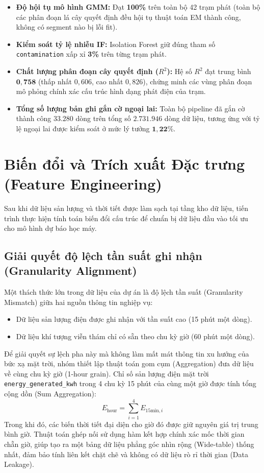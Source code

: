 \documentclass[12pt, a4paper]{report}
\begin{document}
\begin{itemize}
    \item \textbf{Độ hội tụ mô hình GMM:} Đạt \textbf{100\%} trên toàn bộ 42 trạm phát (toàn bộ các phân đoạn lá cây quyết định đều hội tụ thuật toán EM thành công, không có segment nào bị lỗi fit).
    \item \textbf{Kiểm soát tỷ lệ nhiễu IF:} Isolation Forest giữ đúng tham số \texttt{contamination} xấp xỉ \textbf{3\%} trên từng trạm phát.
    \item \textbf{Chất lượng phân đoạn cây quyết định ($R^2$):} Hệ số $R^2$ đạt trung bình $\mathbf{0{,}758}$ (thấp nhất $0{,}606$, cao nhất $0{,}826$), chứng minh các vùng phân đoạn mô phỏng chính xác cấu trúc hình dạng phát điện của trạm.
    \item \textbf{Tổng số lượng bản ghi gắn cờ ngoại lai:} Toàn bộ pipeline đã gắn cờ thành công $\mathbf{33.280}$ dòng trên tổng số $\mathbf{2.731.946}$ dòng dữ liệu, tương ứng với tỷ lệ ngoại lai được kiểm soát ở mức lý tưởng $\mathbf{1{,}22\%}$.
\end{itemize}

\section{Biến đổi và Trích xuất Đặc trưng (Feature Engineering)}
\label{sec:transformation}

Sau khi dữ liệu sản lượng và thời tiết được làm sạch tại tầng kho dữ liệu, tiến trình thực hiện tính toán biến đổi cấu trúc để chuẩn bị dữ liệu đầu vào tối ưu cho mô hình dự báo học máy.

\subsection{Giải quyết độ lệch tần suất ghi nhận (Granularity Alignment)}
Một thách thức lớn trong dữ liệu của dự án là độ lệch tần suất (Granularity Mismatch) giữa hai nguồn thông tin nghiệp vụ:
\begin{itemize}
    \item Dữ liệu sản lượng điện được ghi nhận với tần suất cao (15 phút một dòng).
    \item Dữ liệu khí tượng viễn thám chỉ có sẵn theo chu kỳ giờ (60 phút một dòng).
\end{itemize}

Để giải quyết sự lệch pha này mà không làm mất mát thông tin xu hướng của bức xạ mặt trời, nhóm thiết lập thuật toán gom cụm (Aggregation) đưa dữ liệu về cùng chu kỳ giờ (1-hour grain). Chỉ số sản lượng điện mặt trời \texttt{energy\_generated\_kwh} trong 4 chu kỳ 15 phút của cùng một giờ được tính tổng cộng dồn (Sum Aggregation):
\begin{equation}
E_{\text{hour}} = \sum_{i=1}^{4} E_{15\text{min}, i}
\end{equation}
Trong khi đó, các biến thời tiết đại diện cho giờ đó được giữ nguyên giá trị trung bình giờ. Thuật toán ghép nối sử dụng hàm kết hợp chính xác mốc thời gian chẵn giờ, giúp tạo ra một bảng dữ liệu phẳng góc nhìn rộng (Wide-table) thống nhất, đảm bảo tính liên kết chặt chẽ và không có dữ liệu rò rỉ thời gian (Data Leakage).
\end{document}
